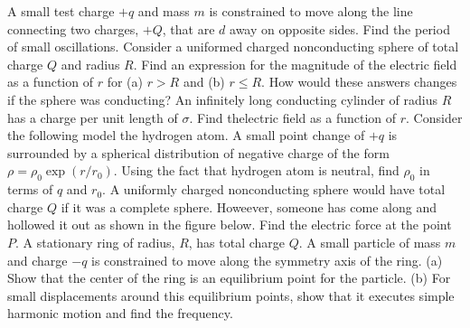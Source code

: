 \documentclass[12pt]{article}
\begin{document}
\newpage
\noindent A small test charge $+q$ and mass $m$ is constrained to move along the line connecting two charges, $+Q$, that are $d$ away on opposite sides.  Find the period of small oscillations.   
\newpage
\noindent Consider a uniformed charged nonconducting sphere of total charge $Q$ and radius $R$.  Find an expression for the magnitude of the electric field as a function of $r$ for (a) $r>R$ and (b) $r\le R$.  How would these answers changes if the sphere was conducting?
\newpage
\noindent An infinitely long conducting cylinder of radius $R$ has a charge per unit length of $\sigma$.  Find thelectric field as a function of $r$.  
\newpage
\noindent Consider the following model the hydrogen atom.  A small point change of $+q$ is surrounded by a spherical distribution of negative charge of the form $\rho = \rho_0 \exp( r/r_0)$.  Using the fact that hydrogen atom is neutral, find $\rho_0$ in terms of $q$ and $r_0$.
\newpage
\noindent A uniformly charged nonconducting sphere would have total charge $Q$ if it was a complete sphere.  Howeever, someone has come along and hollowed it out as shown in the figure below.  Find the electric force at the point $P$.
\newpage
\noindent A stationary ring of radius, $R$, has total charge $Q$.  A small particle of mass $m$ and charge $-q$ is constrained to move along the symmetry axis of the ring.  (a) Show that the center of the ring is an equilibrium point for the particle. (b) For small displacements around this equilibrium points, show that it executes simple harmonic motion and find the frequency.    
\end{document}
